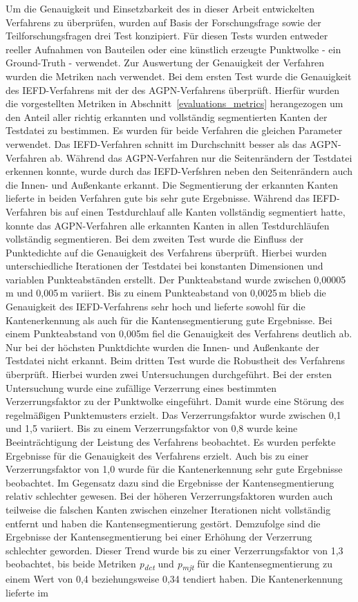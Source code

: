 Um die Genauigkeit und Einsetzbarkeit des in dieser Arbeit entwickelten Verfahrens zu überprüfen, wurden auf Basis der Forschungsfrage sowie der Teilforschungsfragen drei Test konzipiert. Für diesen Tests wurden entweder reeller Aufnahmen von Bauteilen oder eine künstlich erzeugte Punktwolke - ein Ground-Truth - verwendet. Zur Auswertung der Genauigkeit der Verfahren wurden die Metriken nach \autocite[13]{ni_edge_2016} verwendet. Bei dem ersten Test wurde die Genauigkeit des IEFD-Verfahrens mit der des AGPN-Verfahrens überprüft. Hierfür wurden die vorgestellten Metriken in Abschnitt~\ref{evaluations_metrics} herangezogen um den Anteil aller richtig erkannten und vollständig segmentierten Kanten der Testdatei zu bestimmen. Es wurden für beide Verfahren die gleichen Parameter verwendet. Das IEFD-Verfahren schnitt im Durchschnitt besser als das AGPN-Verfahren ab. Während das AGPN-Verfahren nur die Seitenrändern der Testdatei erkennen konnte, wurde durch das IEFD-Verfshren neben den Seitenrändern auch die Innen- und Außenkante erkannt. Die Segmentierung der erkannten Kanten lieferte in beiden Verfahren gute bis sehr gute Ergebnisse. Während das IEFD-Verfahren bis auf einen Testdurchlauf alle Kanten vollständig segmentiert hatte, konnte das AGPN-Verfahren alle erkannten Kanten in allen Testdurchläufen vollständig segmentieren. Bei dem zweiten Test wurde die Einfluss der Punktedichte auf die Genauigkeit des Verfahrens überprüft. Hierbei wurden unterschiedliche Iterationen der Testdatei bei konstanten Dimensionen und variablen Punkteabständen erstellt. Der Punkteabstand wurde zwischen 0,00005\,\si{\m} und 0,005\,\si{\m} variiert. Bis zu einem Punkteabstand von 0,0025\,\si{\m} blieb die Genauigkeit des IEFD-Verfahrens sehr hoch und lieferte sowohl für die Kantenerkennung als auch für die Kantensegmentierung gute Ergebnisse. Bei einem Punkteabstand von 0,005m fiel die Genauigkeit des Verfahrens deutlich ab. Nur bei der höchsten Punktdichte wurden die Innen- und Außenkante der Testdatei nicht erkannt. Beim dritten Test wurde die Robustheit des Verfahrens überprüft. Hierbei wurden zwei Untersuchungen durchgeführt. Bei der ersten Untersuchung wurde eine zufällige Verzerrung eines bestimmten Verzerrungsfaktor zu der Punktwolke eingeführt. Damit wurde eine Störung des regelmäßigen Punktemusters erzielt. Das Verzerrungsfaktor wurde zwischen 0,1 und 1,5 variiert. Bis zu einem Verzerrungsfaktor von 0,8 wurde keine Beeinträchtigung der Leistung des Verfahrens beobachtet. Es wurden perfekte Ergebnisse für die Genauigkeit des Verfahrens erzielt. Auch bis zu einer Verzerrungsfaktor von 1,0 wurde für die Kantenerkennung sehr gute Ergebnisse beobachtet. Im Gegensatz dazu sind die Ergebnisse der Kantensegmentierung relativ schlechter gewesen. Bei der höheren Verzerrungsfaktoren wurden auch teilweise die falschen Kanten zwischen einzelner Iterationen nicht vollständig entfernt und haben die Kantensegmentierung gestört. Demzufolge sind die Ergebnisse der Kantensegmentierung bei einer Erhöhung der Verzerrung schlechter geworden. Dieser Trend wurde bis zu einer Verzerrungsfaktor von 1,3 beobachtet, bis beide Metriken \textit{p\textsubscript{dct}} und \textit{p\textsubscript{mjt}} für die Kantensegmentierung zu einem Wert von 0,4 beziehungsweise 0,34 tendiert haben. Die Kantenerkennung lieferte im 